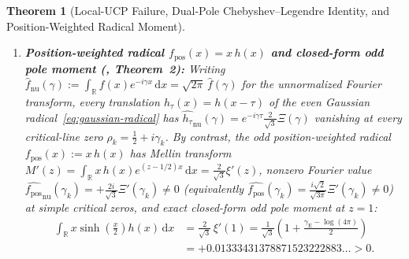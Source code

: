 \documentclass[11pt]{article}
\newtheorem{theorem}{Theorem}[section]
\theoremstyle{remark}
\newcommand{\dd}{\mathrm d}
\begin{document}
\begin{theorem}[Local-UCP Failure, Dual-Pole Chebyshev--Legendre Identity, and Position-Weighted Radical Moment]
\begin{enumerate}[label=(\alph*)]
\begin{equation}
  \end{equation}
  Consequently, with the dual-pole Chebyshev remainder $\widetilde{R}_\psi(x) := \psi(x) - x - \log x + 1$, Stieltjes integration by parts on $[1, e^{2a}]$ produces \textbf{identically zero boundary terms at both endpoints} ($\widetilde{R}_\psi(1) = 0$ and $\widetilde{C}_{m,n}(2) = 0$) and yields the exact identity
  \begin{equation}\label{eq:dual-pole-ibp}
    \bigl(T_{\mathrm{arith}}(a) - T_{\mathrm{pole}}(a)\bigr)_{m,n} = \int_0^2 \frac{\psi(e^{au}) - e^{au} - au + 1}{e^{au/2}}\,\bigl(a\,\widetilde{C}_{m,n}(u) - 2\,\widetilde{C}_{m,n}'(u)\bigr)\,\dd u.
  \end{equation}
  \item \textbf{Position-weighted radical $f_{\mathrm{pos}}(x) = x\,h(x)$ and closed-form odd pole moment (, Theorem~2):} Writing $\widehat{f}_{\mathrm{nu}}(\gamma) := \int_{\mathbb{R}} f(x)e^{-i\gamma x}\,\dd x = \sqrt{2\pi}\,\widehat{f}(\gamma)$ for the unnormalized Fourier transform, every translation $h_\tau(x) = h(x-\tau)$ of the even Gaussian radical~\eqref{eq:gaussian-radical} has $\widehat{h_\tau}_{\mathrm{nu}}(\gamma) = e^{-i\gamma\tau}\frac{2}{\sqrt{3}}\Xi(\gamma)$ vanishing at every critical-line zero $\rho_k = \tfrac{1}{2} + i\gamma_k$. By contrast, the odd position-weighted radical $f_{\mathrm{pos}}(x) := x\,h(x)$ has Mellin transform $M'(z) = \int_{\mathbb{R}} x\,h(x)e^{(z-1/2)x}\,\dd x = \frac{2}{\sqrt{3}}\xi'(z)$, nonzero Fourier value $\widehat{f_{\mathrm{pos}}}_{\mathrm{nu}}(\gamma_k) = +\frac{2i}{\sqrt{3}}\Xi'(\gamma_k) \ne 0$ (equivalently $\widehat{f_{\mathrm{pos}}}(\gamma_k) = \frac{i\sqrt{2}}{\sqrt{3\pi}}\Xi'(\gamma_k) \ne 0$) at simple critical zeros, and exact closed-form odd pole moment at $z = 1$:
  \begin{align}\label{eq:odd-pole-moment-closed}
    \int_{\mathbb{R}} x\sinh\!\left(\frac{x}{2}\right)h(x)\,\dd x &= \frac{2}{\sqrt{3}}\,\xi'(1) = \frac{1}{\sqrt{3}}\!\left(1 + \frac{\gamma_{\mathrm{E}} - \log(4\pi)}{2}\right) \nonumber\\
    &= +0.01333431378871523222883\dots > 0.
  \end{align}
\end{enumerate}
\end{theorem}
\end{document}
